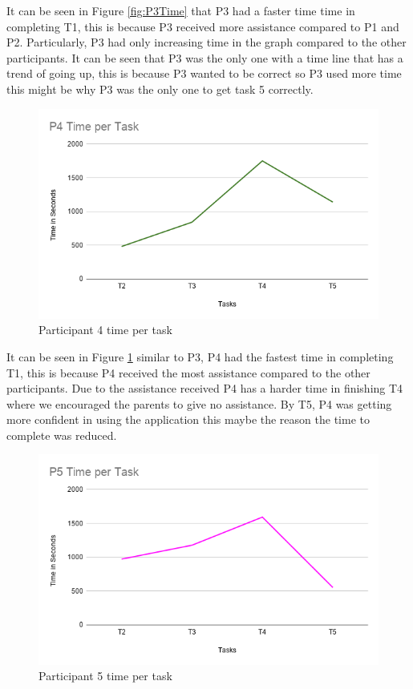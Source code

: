 It can be seen in Figure \ref{fig:P3Time} that P3 had a faster time time in completing T1, this is because P3 received more assistance compared to P1 and P2. Particularly, P3 had only increasing time in the graph compared to the other participants. It can be seen that P3 was the only one with a time line that has a trend of going up, this is because P3 wanted to be correct so P3 used more time this might be why P3 was the only one to get task 5 correctly. 

\begin{figure}[H]
    \centering
    \includegraphics[width=15cm]{figures/Results/P4Time.png}
    \caption{Participant 4 time per task}
    \label{fig:P4Time}
\end{figure}

It can be seen in Figure \ref{fig:P4Time} similar to P3, P4 had the fastest time in completing T1, this is because P4 received the most assistance compared to the other participants. Due to the assistance received P4 has a harder time in finishing T4 where we encouraged the parents to give no assistance. By T5, P4 was getting more confident in using the application this maybe the reason the time to complete was reduced.

\begin{figure}[H]
    \centering
    \includegraphics[width=15cm]{figures/Results/P5Time.png}
    \caption{Participant 5 time per task}
    \label{fig:P5Time}
\end{figure}

